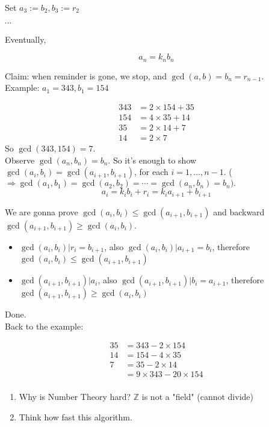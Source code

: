 \documentclass[a4paper, 11pt, twoside]{article}
\begin{document}
Set $a_3:=b_2, b_3:=r_2$

$\cdots$

Eventually,

\[a_n=k_nb_n\]

Claim: when reminder is gone, we stop, and $\gcd(a,b)=b_n=r_{n-1}.$
\\

Example: $a_1=343, b_1=154$

\[
\begin{split}
	343&=2\times 154+ 35\\
	154&=4\times 35 + 14\\
	35&=2\times 14 + 7\\
	14&=2\times 7
\end{split}
\]
So $\gcd(343,154)=7.$\\

Observe $\gcd(a_n,b_n)=b_n$. So it's enough to show $\gcd(a_i,b_i)=\gcd(a_{i+1}, b_{i+1})$, for each $i=1,\dots, n-1.$ ($\Rightarrow \gcd(a_1,b_1)=\gcd(a_2,b_2)=\cdots = \gcd(a_n,b_n)=b_n).$\\

\[a_i=k_ib_i+r_i =k_ia_{i+1}+b_{i+1}\]

We are gonna prove $\gcd(a_i,b_i)\leq\gcd(a_{i+1},b_{i+1})$ and backward $\gcd(a_{i+1},b_{i+1})\geq\gcd(a_i,b_i)$.

\begin{itemize}
	\item $\gcd(a_i,b_i)|r_i=b_{i+1}$, also $\gcd(a_i,b_i)|a_{i+1}=b_i$, therefore $\gcd(a_i, b_i)\leq \gcd(a_{i+1}, b_{i+1})$
	\item $\gcd(a_{i+1}, b_{i+1})|a_i$, also $\gcd(a_{i+1}, b_{i+1})|b_i=a_{i+1}$, therefore $\gcd(a_{i+1},b_{i+1})\geq\gcd(a_i,b_i)$
\end{itemize}

Done.\\

Back to the example:

\[
\begin{split}
	35&=343-2\times 154\\
	14&=154-4\times 35\\
	7&=35-2\times 14\\
	&=9\times343-20\times 154\\
\end{split}
\]

\begin{enumerate}
	\item Why is Number Theory hard? $\mathbb{Z}$ is not a "field" (cannot divide)
	\item Think how fast this algorithm.
\end{enumerate}
\end{document}
